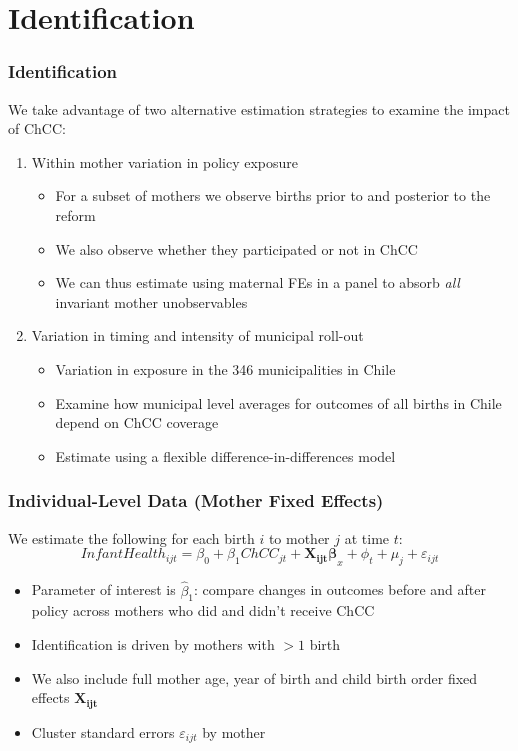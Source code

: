 \documentclass[10pt,letterpaper,subeqn]{beamer}
\begin{document}
\section{Identification}
\begin{frame}
\frametitle{Identification}
We take advantage of two alternative estimation strategies to examine the impact of ChCC: \\ \vspace{4mm}
\begin{enumerate}
\item<1>  Within mother variation in policy exposure
  \begin{itemize}
  \item For a subset of mothers we observe births prior to and posterior to the reform
  \item We also observe whether they participated or not in ChCC
  \item We can thus estimate using maternal FEs in a panel to absorb \emph{all} invariant mother unobservables
  \end{itemize}
\item<2> Variation in timing and intensity of municipal roll-out
  \begin{itemize}
  \item Variation in exposure in the 346 municipalities in Chile
  \item Examine how municipal level averages for outcomes of all births in Chile depend on ChCC coverage
  \item Estimate using a flexible difference-in-differences model
  \end{itemize}
\end{enumerate}
\end{frame}

\begin{frame}
\frametitle{Individual-Level Data (Mother Fixed Effects)}
We estimate the following for each birth $i$ to mother $j$ at time $t$: \vspace{3mm}
\begin{equation}
  \label{eqn:panel}
  Infant Health_{ijt} = \beta_0 + \beta_1 ChCC_{jt} + \bm{X_{ijt}\beta}_{x} + \phi_t + \mu_j + \varepsilon_{ijt}
\end{equation}
\vspace{3mm}
\begin{itemize}
\item Parameter of interest is $\widehat\beta_1$: compare changes in outcomes before and after policy across mothers who did and didn't receive ChCC
\item Identification is driven by mothers with $>1$ birth
\item We also include full mother age, year of birth and child birth order fixed effects $\bm{X_{ijt}}$
\item Cluster standard errors $\varepsilon_{ijt}$ by mother
\end{itemize}
\end{frame}
\end{document}
